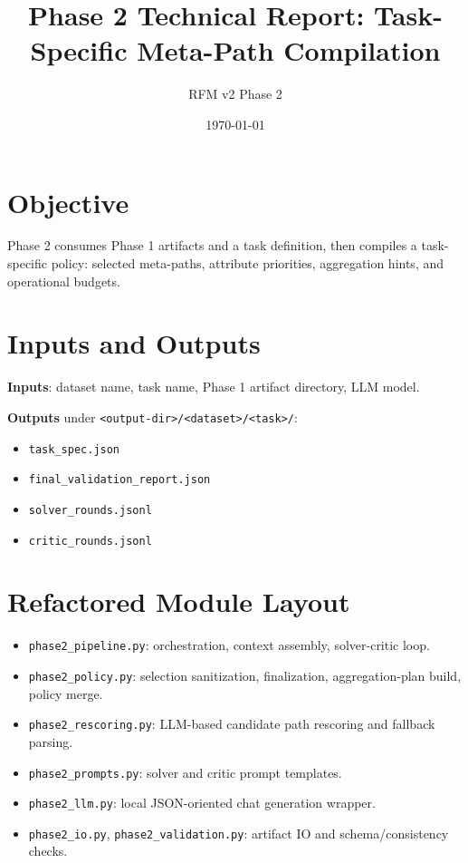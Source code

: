 \documentclass[11pt]{article}
\title{Phase 2 Technical Report: Task-Specific Meta-Path Compilation}
\author{RFM v2 Phase 2}
\date{\today}
\begin{document}
\maketitle

\section{Objective}
Phase 2 consumes Phase 1 artifacts and a task definition, then compiles a task-specific policy: selected meta-paths, attribute priorities, aggregation hints, and operational budgets.

\section{Inputs and Outputs}
\textbf{Inputs}: dataset name, task name, Phase 1 artifact directory, LLM model.

\textbf{Outputs} under \texttt{<output-dir>/<dataset>/<task>/}:
\begin{itemize}[leftmargin=1.5em]
  \item \texttt{task\_spec.json}
  \item \texttt{final\_validation\_report.json}
  \item \texttt{solver\_rounds.jsonl}
  \item \texttt{critic\_rounds.jsonl}
\end{itemize}

\section{Refactored Module Layout}
\begin{itemize}[leftmargin=1.5em]
  \item \texttt{phase2\_pipeline.py}: orchestration, context assembly, solver-critic loop.
  \item \texttt{phase2\_policy.py}: selection sanitization, finalization, aggregation-plan build, policy merge.
  \item \texttt{phase2\_rescoring.py}: LLM-based candidate path rescoring and fallback parsing.
  \item \texttt{phase2\_prompts.py}: solver and critic prompt templates.
  \item \texttt{phase2\_llm.py}: local JSON-oriented chat generation wrapper.
  \item \texttt{phase2\_io.py}, \texttt{phase2\_validation.py}: artifact IO and schema/consistency checks.
\end{itemize}
\end{document}
